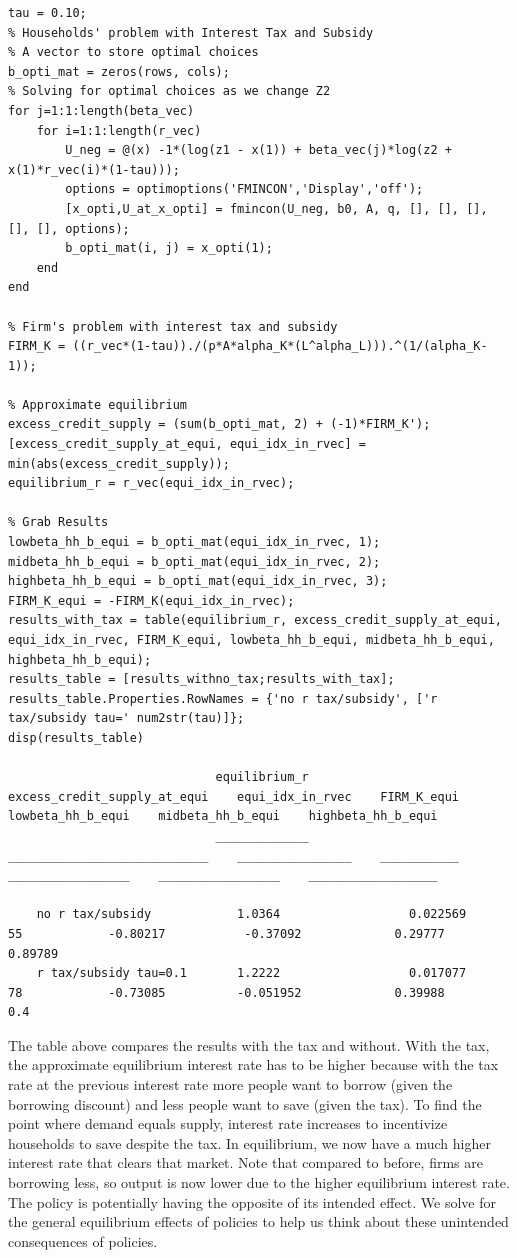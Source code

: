 \documentclass[
]{book}
\begin{document}
\begin{verbatim}
tau = 0.10;
% Households' problem with Interest Tax and Subsidy
% A vector to store optimal choices
b_opti_mat = zeros(rows, cols);
% Solving for optimal choices as we change Z2
for j=1:1:length(beta_vec)
    for i=1:1:length(r_vec)
        U_neg = @(x) -1*(log(z1 - x(1)) + beta_vec(j)*log(z2 + x(1)*r_vec(i)*(1-tau)));
        options = optimoptions('FMINCON','Display','off');
        [x_opti,U_at_x_opti] = fmincon(U_neg, b0, A, q, [], [], [], [], [], options);
        b_opti_mat(i, j) = x_opti(1);
    end
end

% Firm's problem with interest tax and subsidy
FIRM_K = ((r_vec*(1-tau))./(p*A*alpha_K*(L^alpha_L))).^(1/(alpha_K-1));

% Approximate equilibrium
excess_credit_supply = (sum(b_opti_mat, 2) + (-1)*FIRM_K');
[excess_credit_supply_at_equi, equi_idx_in_rvec] = min(abs(excess_credit_supply));
equilibrium_r = r_vec(equi_idx_in_rvec);

% Grab Results
lowbeta_hh_b_equi = b_opti_mat(equi_idx_in_rvec, 1);
midbeta_hh_b_equi = b_opti_mat(equi_idx_in_rvec, 2);
highbeta_hh_b_equi = b_opti_mat(equi_idx_in_rvec, 3);
FIRM_K_equi = -FIRM_K(equi_idx_in_rvec);
results_with_tax = table(equilibrium_r, excess_credit_supply_at_equi, equi_idx_in_rvec, FIRM_K_equi, lowbeta_hh_b_equi, midbeta_hh_b_equi, highbeta_hh_b_equi);
results_table = [results_withno_tax;results_with_tax];
results_table.Properties.RowNames = {'no r tax/subsidy', ['r tax/subsidy tau=' num2str(tau)]};
disp(results_table)

                             equilibrium_r    excess_credit_supply_at_equi    equi_idx_in_rvec    FIRM_K_equi    lowbeta_hh_b_equi    midbeta_hh_b_equi    highbeta_hh_b_equi
                             _____________    ____________________________    ________________    ___________    _________________    _________________    __________________

    no r tax/subsidy            1.0364                  0.022569                     55            -0.80217           -0.37092             0.29777              0.89789      
    r tax/subsidy tau=0.1       1.2222                  0.017077                     78            -0.73085          -0.051952             0.39988                  0.4      
\end{verbatim}

The table above compares the results with the tax and without. With the
tax, the approximate equilibrium interest rate has to be higher because
with the tax rate at the previous interest rate more people want to
borrow (given the borrowing discount) and less people want to save
(given the tax). To find the point where demand equals supply, interest
rate increases to incentivize households to save despite the tax. In
equilibrium, we now have a much higher interest rate that clears that
market. Note that compared to before, firms are borrowing less, so
output is now lower due to the higher equilibrium interest rate. The
policy is potentially having the opposite of its intended effect. We
solve for the general equilibrium effects of policies to help us think
about these unintended consequences of policies.
\end{document}
